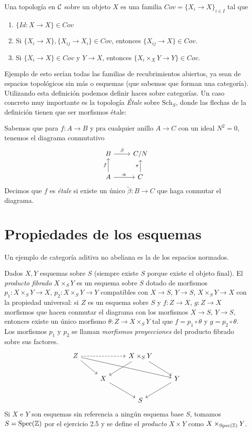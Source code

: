 \documentclass[GA.tex]{subfiles}
\begin{document}
\begin{defi}
Una topología en $\mathcal{C}$ sobre un objeto $X$ es una familia $Cov=\{X_i\to X\}_{i\in I}$ tal que
\begin{enumerate}
\item $\{Id:X\to X\}\in Cov$
\item  Si $\{X_i\to X\}, \{X_{ij}\to X_i\}\in Cov$, entonces $\{X_{ij}\to X\}\in Cov$.
\item Si $\{X_i\to X\}\in Cov$ y $Y\to X$, entonces $\{X_i\times_X Y\to Y\}\in Cov$. 
\end{enumerate} 
\end{defi}
Ejemplo de esto serían todas las familias de recubrimientos abiertos, ya sean de espacios topológicos sin más o esquemas (que sabemos que forman una categoría). Utilizando esta definición podemos definir haces sobre categorías. Un caso concreto muy importante es la topología \emph{Étale} sobre $\mathrm{Sch}_S$, donde las flechas de la definición tienen que ser morfismos étale:
\begin{defi}
Sabemos que para $f:A\to B$ y pra cualquier anillo $A\to C$ con un ideal $N^2=0$, tenemos el diagrama conmutativo
\[
\begin{tikzcd}
B \arrow[r, "\beta"] & C/N\\
A\arrow[u, "f"]\arrow[r, "\alpha"] & C\arrow[u, "\pi"]
\end{tikzcd}
\]
Decimos que $f$ es \emph{étale} si existe un único $\tilde{\beta}:B\to C$ que haga conmutar el diagrama. 
\end{defi}

\section{Propiedades de los esquemas}

Un ejemplo de categoría aditiva no abeliana es la de los espacios normados.

\begin{defi}
Dados $X,Y$ esquemas sobre $S$ (siempre existe $S$ porque existe el objeto final). El \emph{producto fibrado} $X\times_S Y$ es un esquema sobre $S$ dotado de morfismos $p_1:X\times_S Y\to X$, $p_2:X\times_S Y\to Y$ compatibles con $X\to S$, $Y\to S$, $X\times_S Y\to X$ con la propiedad universal: si $Z$ es un esquema sobre $S$ y $f:Z\to X$, $g:Z\to X$ morfismos que hacen conmutar el diagrama con los morfismos $X\to S$, $Y\to S$, entonces existe un único morfismo $\theta:Z\to X\times_S Y$ tal que $f=p_1\circ\theta$ y $g=p_2\circ\theta$. Los morfismos $p_1$ y $p_2$ se llaman \emph{morfismos proyecciones} del producto fibrado sobre sus factores.
\[
\begin{tikzcd}
Z\arrow[rr, dashed]\arrow[dr]\arrow[drrr] & &X\times_S Y\arrow[dr]\arrow[dl] & \\
&                              X\arrow[dr] & & Y\arrow[dl]\\
& & S & 
\end{tikzcd}
\]
Si $X$ e $Y$ son esquemas sin referencia a ningún esquema base $S$, tomamos $S=\operatorname{Spec}(\mathbb{Z})$ por el ejercicio 2.5 y se define el \emph{producto} $X\times Y$ como $X\times_{\operatorname{Spec}(\mathbb{Z})}Y$.
\end{defi}
\end{document}
